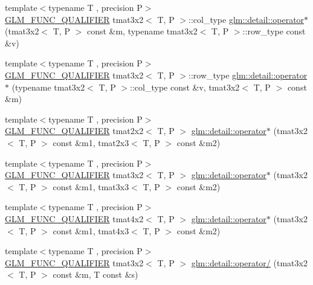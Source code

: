 \begin{DoxyCompactItemize}
\item 
{\footnotesize template$<$typename T , precision P$>$ }\\\hyperlink{setup_8hpp_a33fdea6f91c5f834105f7415e2a64407}{G\+L\+M\+\_\+\+F\+U\+N\+C\+\_\+\+Q\+U\+A\+L\+I\+F\+I\+ER} tmat3x2$<$ T, P $>$\+::col\+\_\+type \hyperlink{namespaceglm_1_1detail_a2a14e38911405a427979a84f2131eb09}{glm\+::detail\+::operator$\ast$} (tmat3x2$<$ T, P $>$ const \&m, typename tmat3x2$<$ T, P $>$\+::row\+\_\+type const \&v)
\item 
{\footnotesize template$<$typename T , precision P$>$ }\\\hyperlink{setup_8hpp_a33fdea6f91c5f834105f7415e2a64407}{G\+L\+M\+\_\+\+F\+U\+N\+C\+\_\+\+Q\+U\+A\+L\+I\+F\+I\+ER} tmat3x2$<$ T, P $>$\+::row\+\_\+type \hyperlink{namespaceglm_1_1detail_ad3769f1e77b107456f2609eb9f6d47b9}{glm\+::detail\+::operator$\ast$} (typename tmat3x2$<$ T, P $>$\+::col\+\_\+type const \&v, tmat3x2$<$ T, P $>$ const \&m)
\item 
{\footnotesize template$<$typename T , precision P$>$ }\\\hyperlink{setup_8hpp_a33fdea6f91c5f834105f7415e2a64407}{G\+L\+M\+\_\+\+F\+U\+N\+C\+\_\+\+Q\+U\+A\+L\+I\+F\+I\+ER} tmat2x2$<$ T, P $>$ \hyperlink{namespaceglm_1_1detail_a7c4025de34f21af1d085e01977a0aad7}{glm\+::detail\+::operator$\ast$} (tmat3x2$<$ T, P $>$ const \&m1, tmat2x3$<$ T, P $>$ const \&m2)
\item 
{\footnotesize template$<$typename T , precision P$>$ }\\\hyperlink{setup_8hpp_a33fdea6f91c5f834105f7415e2a64407}{G\+L\+M\+\_\+\+F\+U\+N\+C\+\_\+\+Q\+U\+A\+L\+I\+F\+I\+ER} tmat3x2$<$ T, P $>$ \hyperlink{namespaceglm_1_1detail_a1f7a4d6f6f380571243d8ad4565f0b7e}{glm\+::detail\+::operator$\ast$} (tmat3x2$<$ T, P $>$ const \&m1, tmat3x3$<$ T, P $>$ const \&m2)
\item 
{\footnotesize template$<$typename T , precision P$>$ }\\\hyperlink{setup_8hpp_a33fdea6f91c5f834105f7415e2a64407}{G\+L\+M\+\_\+\+F\+U\+N\+C\+\_\+\+Q\+U\+A\+L\+I\+F\+I\+ER} tmat4x2$<$ T, P $>$ \hyperlink{namespaceglm_1_1detail_a244c6f51d06cfede45c60d29c8dc40f7}{glm\+::detail\+::operator$\ast$} (tmat3x2$<$ T, P $>$ const \&m1, tmat4x3$<$ T, P $>$ const \&m2)
\item 
{\footnotesize template$<$typename T , precision P$>$ }\\\hyperlink{setup_8hpp_a33fdea6f91c5f834105f7415e2a64407}{G\+L\+M\+\_\+\+F\+U\+N\+C\+\_\+\+Q\+U\+A\+L\+I\+F\+I\+ER} tmat3x2$<$ T, P $>$ \hyperlink{namespaceglm_1_1detail_a7162ac9c168b4bf1e34af0bd32835b20}{glm\+::detail\+::operator/} (tmat3x2$<$ T, P $>$ const \&m, T const \&s)

\end{DoxyCompactItemize}

